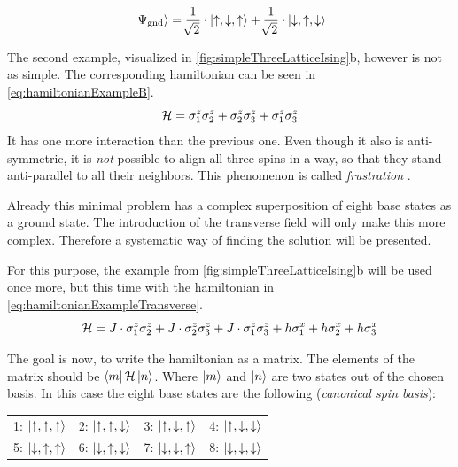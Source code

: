 \begin{equation}
    \label{eq:solutionSimpleExample}
    \ket{\Psi_\mathrm{gnd}} = \frac{1}{\sqrt[]{2}} \cdot \ket{\uparrow, \downarrow, \uparrow} +  \frac{1}{\sqrt[]{2}} \cdot \ket{\downarrow, \uparrow, \downarrow}
\end{equation}

The second example, visualized in \autoref{fig:simpleThreeLatticeIsing}b, however is not as simple. The corresponding hamiltonian can be seen in \autoref{eq:hamiltonianExampleB}.
\begin{equation}
    \label{eq:hamiltonianExampleB}
    \mathcal{H} = \sigma^z_1\sigma^z_2 +\sigma^z_2\sigma^z_3 +\sigma^z_1\sigma^z_3
\end{equation}
It has one more interaction than the previous one. Even though it also is anti-symmetric, it is \emph{not} possible to align all three spins in a way, so that they stand anti-parallel to all their neighbors. This phenomenon is called \emph{frustration} \cite{frustration}.

Already this minimal problem has a complex superposition of eight base states as a ground state. The introduction of the transverse field will only make this more complex. Therefore a systematic way of finding the solution will be presented.

For this purpose, the example from \autoref{fig:simpleThreeLatticeIsing}b will be used once more, but this time with the hamiltonian in \autoref{eq:hamiltonianExampleTransverse}.
\begin{equation}
    \label{eq:hamiltonianExampleTransverse}
    \mathcal{H} = J\cdot \sigma^z_1\sigma^z_2 +J\cdot\sigma^z_2\sigma^z_3 +J\cdot\sigma^z_1\sigma^z_3
    +h \sigma^x_1+h \sigma^x_2+h \sigma^x_3
\end{equation}

The goal is now, to write the hamiltonian \hamiltonian as a matrix. 
The elements of the matrix should be $\bra{m}\mathcal{H}\ket{n}$. Where $\ket{m}$ and $\ket{n}$ are two states out of the chosen basis. In this case the eight base states are the following (\emph{canonical spin basis}):

\begin{center}
    \begin{tabular}{llll} 
        1: $\ket{\uparrow, \uparrow, \uparrow}$ & 2: $\ket{\uparrow, \uparrow, \downarrow}$  & 3: $\ket{\uparrow, \downarrow, \uparrow}$  & 4: $\ket{\uparrow, \downarrow, \downarrow}$ \\
        5: $\ket{\downarrow, \uparrow, \uparrow}$ & 6: $\ket{\downarrow, \uparrow, \downarrow}$  & 7: $\ket{\downarrow, \downarrow, \uparrow}$  & 8: $\ket{\downarrow, \downarrow, \downarrow}$ 
    \end{tabular}
\end{center}

